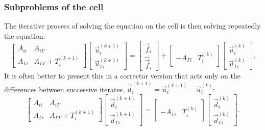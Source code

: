 \documentclass{beamer}
\begin{document}
\begin{frame}
\frametitle{Subproblems of the cell}

The iterative process of solving the equation on the cell is then solving repeatedly the equation:
\begin{equation} \label{eq: sym cells}
	\begin{bmatrix}
		A_{ii} & A_{i \Gamma} \\
		A_{\Gamma i} & A_{\Gamma \Gamma} + T_i^{(k+1)}
	\end{bmatrix}
	\begin{bmatrix} \vec{u}_i^{(k+1)} \\ \vec{u}_{\Gamma i}^{(k+1)} \end{bmatrix}
	=
	\begin{bmatrix} \vec{f}_i \\ \hat{\vec{f}}_i \end{bmatrix}
	+
	\begin{bmatrix} ~ \\ -A_{\Gamma i} & T_i^{(k)} \end{bmatrix}
	\begin{bmatrix} \vec{u}_i^{(k)} \\ \vec{u}_{\Gamma i}^{(k)} \end{bmatrix}.
\end{equation}
It is often better to present this in a corrector version that acts only on the differences between successive iterates, $\vec{d}_i^{(k+1)} = \vec{u}_i^{(k+1)} - \vec{u}_i^{(k)}$:
\begin{equation} \label{eq: sym cells AOSM}
	\begin{bmatrix}
		A_{ii} & A_{i \Gamma} \\
		A_{\Gamma i} & A_{\Gamma \Gamma} + T_i^{(k+1)}
	\end{bmatrix}
	\begin{bmatrix} \vec{d}_i^{(k+1)} \\ \vec{d}_{\Gamma i}^{(k+1)} \end{bmatrix}
	=
	\begin{bmatrix} ~ \\ -A_{\Gamma i} & T_i^{(k)} \end{bmatrix}
	\begin{bmatrix} \vec{d}_i^{(k)} \\ \vec{d}_{\Gamma i}^{(k)} \end{bmatrix}.
\end{equation}
\end{frame}
\end{document}
